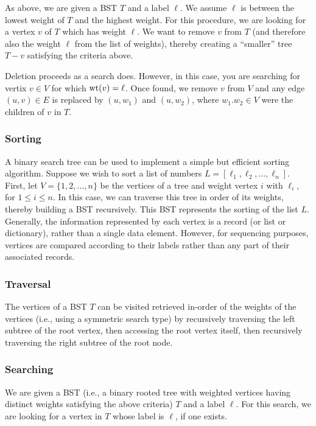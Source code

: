 As above, we are given a BST $T$ and a
label $\ell$. We assume $\ell$ is between the
lowest weight of $T$ and the highest weight.
For this procedure, we are looking for a vertex $v$ of
$T$ which has weight $\ell$. We want to remove $v$ from
$T$ (and therefore also the weight $\ell$ from the list of weights),
thereby creating a ``smaller'' tree $T- v$ satisfying
the criteria above.

Deletion proceeds as a search does. However, in this case, you are
searching for vertix $v\in V$ for which
${\rm wt}(v)=\ell$. Once found, we remove $v$ from $V$
and any edge $(u,v)\in E$ is replaced by $(u,w_1)$
and $(u,w_2)$, where $w_1.w_2\in V$ were the children of $v$
in $T$.

\subsubsection{Sorting}

A binary search tree can be used to implement a simple but efficient
sorting algorithm. Suppose we wish to sort a list of numbers
$L = [\ell_1, \ell_2,\dots, \ell_n]$. First, let $V=\{1,2,\dots,n\}$
be the vertices of a tree and weight vertex $i$ with $\ell_i$,
for $1\leq i\leq n$. In this case, we can traverse this tree
in order of its weights, thereby building a BST recursively.
This BST represents the sorting of the list $L$.
Generally, the information represented by each vertex is a
record (or list or dictionary), rather than a single data element. However,
for sequencing purposes, vertices are compared according to their
labels rather than any part of their associated records.

\subsubsection{Traversal}

The vertices of a BST $T$ can be visited retrieved in-order of the
weights of the vertices (i.e.,
using a symmetric search type) by recursively  traversing the left subtree of the
root vertex, then accessing the root vertex itself, then recursively traversing the
right subtree of the root node.

\subsubsection{Searching}

We are given a BST (i.e., a binary rooted tree with weighted vertices
having distinct weights satisfying the above criteria) $T$ and a
label $\ell$. For this search, we are looking for a vertex in $T$
whose label is $\ell$, if one exists.

